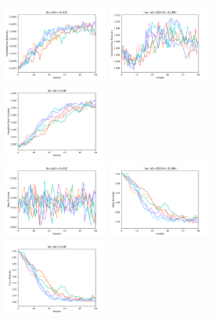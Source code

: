 \documentclass{aa}
\begin{document}
\begin{figure}
  \centering
  \includegraphics[width=0.33\textwidth]{figs/mixing/total_star_trace_3121308.pdf} 
  \includegraphics[width=0.33\textwidth]{figs/mixing/total_star_trace_2429499.pdf}
  \includegraphics[width=0.33\textwidth]{figs/mixing/total_star_trace_1352704.pdf}\\
   \includegraphics[width=0.33\textwidth]{figs/mixing/star_trace_3121308.pdf} 
  \includegraphics[width=0.33\textwidth]{figs/mixing/star_trace_2429499.pdf}
  \includegraphics[width=0.33\textwidth]{figs/mixing/star_trace_1352704.pdf}\\

\end{figure}
\end{document}

